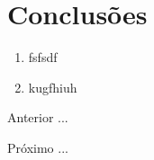 







\section{Conclusões}


\begin{enumerate}[label=\Roman{*}, ref=(\roman{*})]
  \item fsfsdf
  \item kugfhiuh
\end{enumerate}

\begin{asparaenum}
\item Anterior ... \cite{ninguem2022curioso}
\item Próximo ... \label{pl1}
\end{asparaenum}









